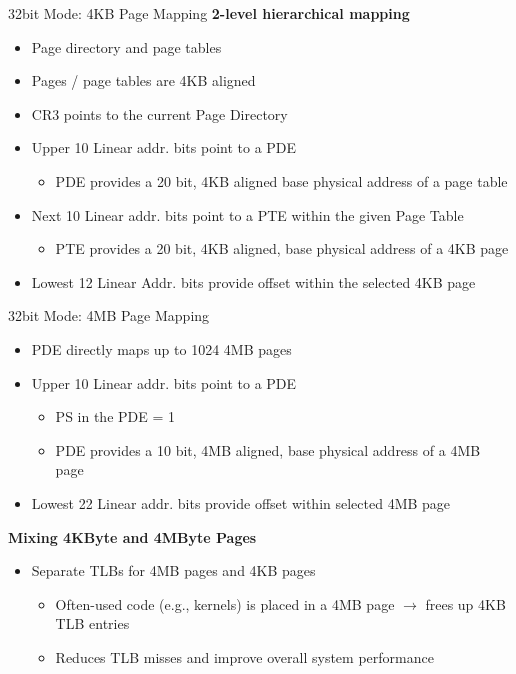 \documentclass[aspectratio=169,12pt]{beamer}
\begin{document}
\begin{frame}{32bit Mode: 4KB Page Mapping}
\textbf{2-level hierarchical mapping}
\begin{itemize}
\item Page directory and page tables
\item Pages / page tables are 4KB aligned
\end{itemize}

\begin{itemize}
\item CR3 points to the current Page Directory
\item Upper 10 Linear addr. bits point to a PDE
    \begin{itemize}
    \item PDE provides a 20 bit, 4KB aligned base physical address of a page table
    \end{itemize}
\item Next 10 Linear addr. bits point to a PTE within the given Page Table
    \begin{itemize}
    \item PTE provides a 20 bit, 4KB aligned, base physical address of a 4KB page
    \end{itemize}
\item Lowest 12 Linear Addr. bits provide offset within the selected 4KB page
\end{itemize}
\end{frame}

\begin{frame}{32bit Mode: 4MB Page Mapping}
\begin{itemize}
\item PDE directly maps up to 1024 4MB pages
\item Upper 10 Linear addr. bits point to a PDE
    \begin{itemize}
    \item PS in the PDE = 1
    \item PDE provides a 10 bit, 4MB aligned, base physical address of a 4MB page
    \end{itemize}
\item Lowest 22 Linear addr. bits provide offset within selected 4MB page
\end{itemize}

\textbf{Mixing 4KByte and 4MByte Pages}
\begin{itemize}
\item Separate TLBs for 4MB pages and 4KB pages
    \begin{itemize}
    \item Often-used code (e.g., kernels) is placed in a 4MB page $\rightarrow$ frees up 4KB TLB entries
    \item Reduces TLB misses and improve overall system performance
    \end{itemize}
\end{itemize}
\end{frame}
\end{document}
